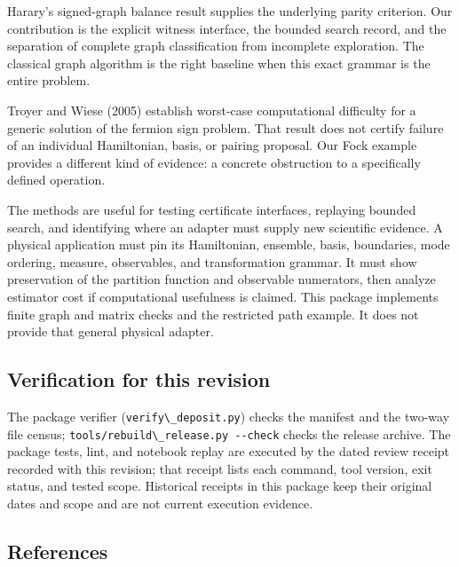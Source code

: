 \documentclass[
  11pt,
]{article}
\newcommand{\passthrough}[1]{#1}
\begin{document}
Harary's signed-graph balance result supplies the underlying parity
criterion. Our contribution is the explicit witness interface, the
bounded search record, and the separation of complete graph
classification from incomplete exploration. The classical graph
algorithm is the right baseline when this exact grammar is the entire
problem.

Troyer and Wiese (2005) establish worst-case computational difficulty
for a generic solution of the fermion sign problem. That result does not
certify failure of an individual Hamiltonian, basis, or pairing
proposal. Our Fock example provides a different kind of evidence: a
concrete obstruction to a specifically defined operation.

The methods are useful for testing certificate interfaces, replaying
bounded search, and identifying where an adapter must supply new
scientific evidence. A physical application must pin its Hamiltonian,
ensemble, basis, boundaries, mode ordering, measure, observables, and
transformation grammar. It must show preservation of the partition
function and observable numerators, then analyze estimator cost if
computational usefulness is claimed. This package implements finite
graph and matrix checks and the restricted path example. It does not
provide that general physical adapter.

\subsection{Verification for this
revision}\label{verification-for-this-revision}

The package verifier (\passthrough{\lstinline!verify\_deposit.py!})
checks the manifest and the two-way file census;
\passthrough{\lstinline!tools/rebuild\_release.py --check!} checks the
release archive. The package tests, lint, and notebook replay are
executed by the dated review receipt recorded with this revision; that
receipt lists each command, tool version, exit status, and tested scope.
Historical receipts in this package keep their original dates and scope
and are not current execution evidence.

\subsection{References}\label{references}
\end{document}

